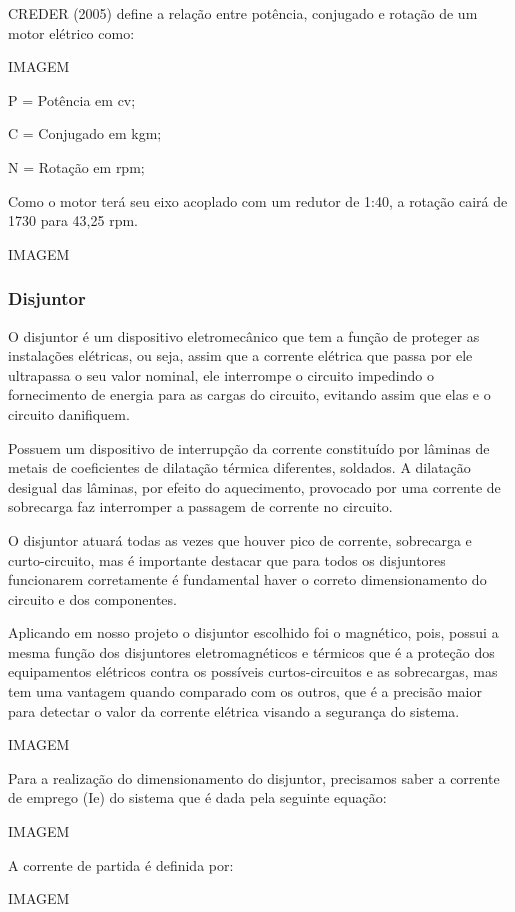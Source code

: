 CREDER (2005) define a relação entre potência, conjugado e rotação de um motor elétrico como:

IMAGEM

P = Potência em cv;

C = Conjugado em kgm;

N = Rotação em rpm;

Como o motor terá seu eixo acoplado com um redutor de 1:40, a rotação cairá de 1730 para 43,25 rpm.

IMAGEM

\subsubsection{Disjuntor}

O disjuntor é um dispositivo eletromecânico que tem a função de proteger as instalações elétricas, ou seja, assim que a corrente elétrica que passa por ele ultrapassa o seu valor nominal, ele interrompe o circuito impedindo o fornecimento de energia para as cargas do circuito, evitando assim que elas e o circuito danifiquem.

Possuem um dispositivo de interrupção da corrente constituído por lâminas de metais de coeficientes de dilatação térmica diferentes, soldados. A dilatação desigual das lâminas, por efeito do aquecimento, provocado por uma corrente de sobrecarga faz interromper a passagem de corrente no circuito.

O disjuntor atuará todas as vezes que houver pico de corrente, sobrecarga e curto-circuito, mas é importante destacar que para todos os disjuntores funcionarem corretamente é fundamental haver o correto dimensionamento do circuito e dos componentes.

Aplicando em nosso projeto o disjuntor escolhido foi o magnético, pois, possui a mesma função dos disjuntores eletromagnéticos e térmicos que é a proteção dos equipamentos elétricos contra os possíveis curtos-circuitos e as sobrecargas, mas tem uma vantagem quando comparado com os outros, que é a precisão maior para detectar o valor da corrente elétrica visando a segurança do sistema.

IMAGEM

Para a realização do dimensionamento do disjuntor, precisamos saber a corrente de emprego (Ie) do sistema que é dada pela seguinte equação:

IMAGEM

A corrente de partida é definida por:

IMAGEM

